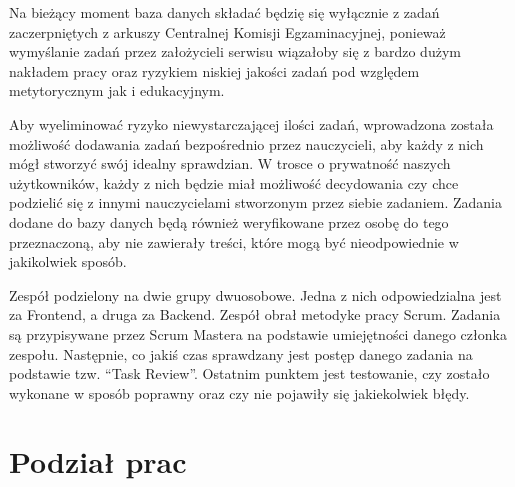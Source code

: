 \documentclass[oneside,polski,logo,indent]{amuthesis}
\begin{document}
Na bieżący moment baza danych składać będzię się wyłącznie z zadań zaczerpniętych z arkuszy Centralnej Komisji Egzaminacyjnej, ponieważ wymyślanie zadań przez założycieli serwisu wiązałoby się z bardzo dużym nakładem pracy oraz ryzykiem niskiej jakości zadań pod względem metytorycznym jak i edukacyjnym. 

Aby wyeliminować ryzyko niewystarczającej ilości zadań, wprowadzona została możliwość dodawania zadań bezpośrednio przez nauczycieli, aby każdy z nich mógł stworzyć swój idealny sprawdzian. W trosce o prywatność naszych użytkowników, każdy z nich będzie miał możliwość decydowania czy chce podzielić się z innymi nauczycielami stworzonym przez siebie zadaniem. Zadania dodane do bazy danych będą również weryfikowane przez osobę do tego przeznaczoną, aby nie zawierały treści, które mogą być nieodpowiednie w jakikolwiek sposób.

Zespół podzielony na dwie grupy dwuosobowe. Jedna z nich odpowiedzialna jest za Frontend, a druga za Backend. Zespół obrał metodyke pracy Scrum. Zadania są przypisywane przez Scrum Mastera na podstawie umiejętności danego członka zespołu. Następnie, co jakiś czas sprawdzany jest postęp danego zadania na podstawie tzw. “Task Review”. Ostatnim punktem jest testowanie, czy zostało wykonane w sposób poprawny oraz czy nie pojawiły się jakiekolwiek błędy.


\section{Podział prac}
\end{document}
